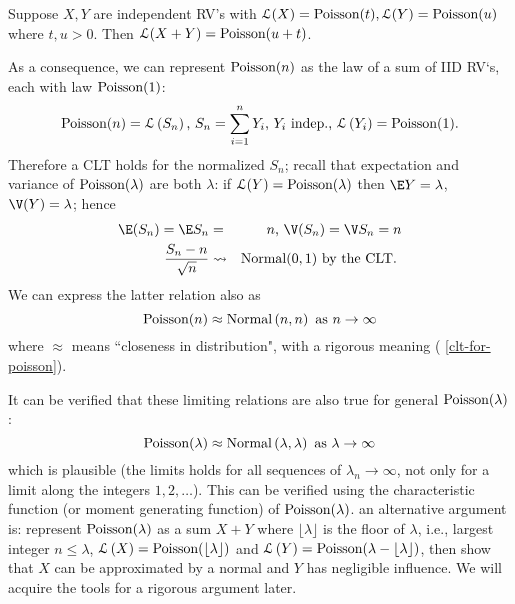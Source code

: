 \begin{Exercise}[title={Sum of independent $\poisson$ RVs is a $\poisson$ RV},label={SumOfIndPoissons}]
Suppose $X,Y$ are independent RV's with $\mathcal{L}(X)=%
\poisson(t),\mathcal{L}(Y)=\poisson(u)$ where $t,u>0$. Then $\mathcal{L%
}(X+Y)=\poisson(u+t)$.
\end{Exercise}

As a consequence, we can represent $\mbox{{\rm Poisson}}(n)$ as the law of a sum of
IID RV`s, each with law $\mbox{{\rm Poisson}}(1)$:%
\begin{equation*}
\poisson(n)=\mathcal{L}\left( S_{n}\right) \text{, }S_{n}=%
\sum_{i=1}^{n}Y_{i}\text{, }Y_{i}\text{ indep., }\mathcal{L}\left(
Y_{i}\right) =\poisson(1).
\end{equation*}%
Therefore a CLT holds for the normalized $S_{n}$; recall that expectation
and variance of $\mbox{{\rm Poisson}}(\lambda )$ are both $\lambda $: if $\mathcal{L}%
(Y)=\poisson(\lambda )$ then $\E Y=\lambda $, $\V(Y)=\lambda $;
hence 
\begin{eqnarray}
\E (S_n) = \E S_{n} &=&n\text{, }\V(S_{n})= \V S_n = n \\
\frac{S_{n}-n}{\sqrt{n}} &\rightsquigarrow &\normal(0,1)\text{ by the CLT. }
\label{clt-for-poisson}
\end{eqnarray}%
We can express the latter relation also as 
\begin{equation*}
\mbox{{\rm Poisson}}(n)\approx \mbox{{\rm Normal}}\left( n,n\right) \text{ as }n\rightarrow \infty
\end{equation*}%
where $\approx $ means ``closeness in distribution", with a rigorous meaning (%
\ref{clt-for-poisson}). \bigskip \bigskip

\begin{rem}
It can be verified that these limiting relations are also
true for general $\mbox{{\rm Poisson}}(\lambda )$:%
\begin{equation*}
\poisson(\lambda )\approx \normal\left( \lambda ,\lambda \right) \text{ as }%
\lambda \rightarrow \infty
\end{equation*}%
which is plausible (the limits holds for all sequences of $\lambda
_{n}\rightarrow \infty $, not only for a limit along the integers $%
1,2,\ldots $). This can be verified using the characteristic function (or moment generating function) of $%
\poisson(\lambda )$. an alternative argument is: represent $\poisson%
(\lambda )$ as a sum $X+Y$ where $\lfloor \lambda \rfloor$ is the floor of $\lambda$, i.e., largest integer $n\leq
\lambda $, $\mathcal{L}\left( X\right) =\mbox{{\rm Poisson}}(\lfloor \lambda \rfloor)$ and $%
\mathcal{L}\left( Y\right) =\poisson(\lambda - \lfloor \lambda \rfloor)$, then show
that $X$ can be approximated by a normal and $Y$ has negligible influence.
We will acquire the tools for a rigorous argument later.
\end{rem}

